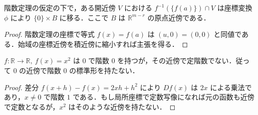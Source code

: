 \begin{prop}[定階数写像の等位集合]
階数定理の仮定の下で，ある開近傍 $V$ における $f^{-1}(\{f(a)\})\cap V$ は座標変換 $\phi$ により $\{0\}\times B$ に移る．ここで $B$ は $\mathbb R^{m-r}$ の原点近傍である．
\end{prop}
\begin{proof}
階数定理の座標で等式 $f(x)=f(a)$ は $(u,0)=(0,0)$ と同値である．始域の座標近傍を積近傍に縮小すれば主張を得る．
\end{proof}
\begin{example}[階数が一定でない場合]
$f:\mathbb R\to\mathbb R,\ f(x)=x^2$ は $0$ で階数 $0$ を持つが，その近傍で定階数でない．従って $0$ の近傍で階数 $0$ の標準形を持たない．
\end{example}
\begin{proof}
差分 $f(x+h)-f(x)=2xh+h^2$ により $Df(x)$ は $2x$ による乗法であり，$x\ne0$ で階数 $1$ である．もし局所座標で定数写像になれば元の函数も近傍で定数となるが，$x^2$ はそのような近傍を持たない．
\end{proof}
